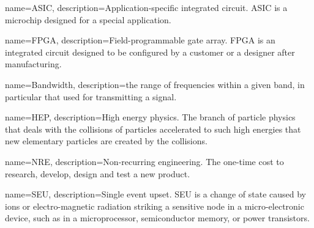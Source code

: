 {
    name=ASIC,
    description={Application-specific integrated circuit. ASIC is a microchip designed for a special application.}
}

{
    name=FPGA,
    description={Field-programmable gate array. FPGA is an integrated circuit designed to be configured by a customer or a designer after manufacturing.}
}

{
    name=Bandwidth,
    description={the range of frequencies within a given band, in particular that used for transmitting a signal.}
}

{
    name=HEP,
    description={High energy physics. The branch of particle physics that deals with the collisions of particles accelerated to such high energies that new elementary particles are created by the collisions.}
}

{
    name=NRE,
    description={Non-recurring engineering. The one-time cost to research, develop, design and test a new product.}
}

{
    name=SEU,
    description={Single event upset. SEU is a change of state caused by ions or electro-magnetic radiation striking a sensitive node in a micro-electronic device, such as in a microprocessor, semiconductor memory, or power transistors.}
}
